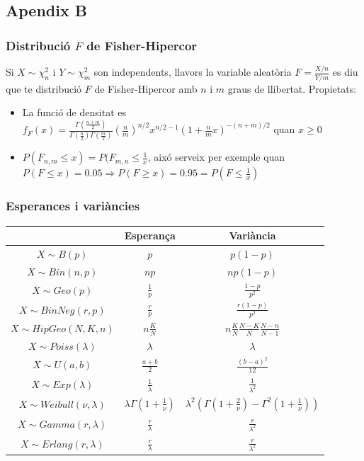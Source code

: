 \documentclass[a4paper]{sciposter}
\begin{document}
\begin{multicols}{3}
\subsection{Apendix B}
\subsubsection{Distribució $F$ de Fisher-Hipercor}
Si $X \sim \chi^2_n$ i $Y \sim \chi^2_m$ son independents, llavors la variable aleatòria $F = \frac{X/n}{Y/m}$ es diu que te distribució $F$ de Fisher-Hipercor amb $n$ i $m$ graus de llibertat.
Propietats:
\begin{itemize}
	\item La funció de densitat es\\ $f_F(x) = \frac{\Gamma(\frac{n+m}{2})}{\Gamma(\frac{n}{2})\Gamma(\frac{m}{2})}(\frac{n}{m})^{n/2}x^{n/2-1}\left(1+\frac{n}{m}x\right)^{-(n+m)/2}$ quan $x\geq 0$
	\item $P(F_{n,m}\leq x) = P(F_{m,n}\leq \frac{1}{x}$, aixó serveix per exemple quan $P(F \leq x) = 0.05 \Rightarrow P(F \geq x) = 0.95 =  P(F \leq \frac{1}{x})$
\end{itemize}
\subsubsection{Esperances i variàncies}
\begin{tabular}{|c|c|c|}
	\hline
	& Esperança & Variància\\
	\hline
	$X \sim B(p)$ & $p$ & $p(1-p)$\\
	\hline
	$X \sim Bin(n,p)$ & $np$ & $np(1-p)$\\
	\hline
	$X \sim Geo(p)$ & $\frac{1}{p}$ & $\frac{1-p}{p^2}$\\
	\hline
	$X \sim BinNeg(r,p)$ & $\frac{r}{p}$ & $\frac{r(1-p)}{p^2}$\\
	\hline
	$X \sim HipGeo(N,K,n)$ & $n\frac{K}{N}$ & $n\frac{K}{N}\frac{N-K}{N}\frac{N-n}{N-1}$\\
	\hline
	$X \sim Poiss(\lambda)$ & $\lambda$ & $\lambda$\\
	\hline
	$X \sim U(a,b)$ & $\frac{a+b}{2}$ & $\frac{(b-a)^2}{12}$\\
	\hline
	$X \sim Exp(\lambda)$ & $\frac{1}{\lambda}$ & $\frac{1}{\lambda^2}$\\
	\hline
	$X \sim Weibull(\nu, \lambda)$ & $\lambda\Gamma(1+\frac{1}{\nu})$ & $\lambda^2(\Gamma(1+\frac{2}{\nu}) - \Gamma^2(1+\frac{1}{\nu}))$\\
	\hline
	$X \sim Gamma(r, \lambda)$ & $\frac{r}{\lambda}$ & $\frac{r}{\lambda^2}$\\
	\hline
	$X \sim Erlang(r, \lambda)$ & $\frac{r}{\lambda}$ & $\frac{r}{\lambda^2}$\\
	\hline
\end{tabular}
\end{multicols}
\end{document}
